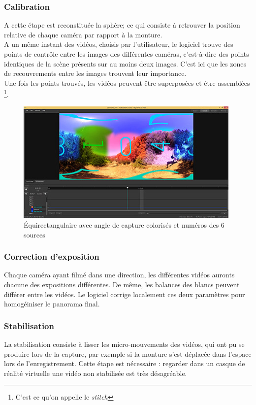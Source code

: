 \subsubsection{Calibration}
A cette étape est reconstituée la sphère; ce qui consiste à retrouver la 
position relative de chaque caméra par rapport à la monture.\\
A un même instant des vidéos, choisis par l'utilisateur, le logiciel trouve des
points de contrôle entre les images des différentes caméras, c'est-à-dire des
points identiques de la scène présents sur au moins deux images. C'est ici que les 
zones de recouvrements entre les images trouvent leur importance.\\
Une fois les points trouvés, les vidéos peuvent être superposées et être assemblées
\footnote{C'est ce qu'on appelle le \textit{stitch}}.
\begin{figure}
  \centering
  \includegraphics[width=11cm]{images/studio-output-angles-numeros.jpg}
  \caption{Équirectangulaire avec angle de capture colorisés et numéros des 6 sources} 
\end{figure}

\subsubsection{Correction d'exposition}
Chaque caméra ayant filmé dans une direction, les différentes vidéos auronts chacune 
des expositions différentes. De même, les balances des blancs peuvent différer
entre les vidéos. Le logiciel corrige localement ces deux paramètres pour homogéiniser
le panorama final.

\subsubsection{Stabilisation}
La stabilisation consiste à  lisser les micro-mouvements des vidéos, qui ont 
pu se produire lors de la capture, par exemple si la monture s'est déplacée dans l'espace lors
de l'enregistrement. Cette étape est nécessaire : regarder dans un casque de réalité
virtuelle une vidéo non stabilisée est très désagréable.

